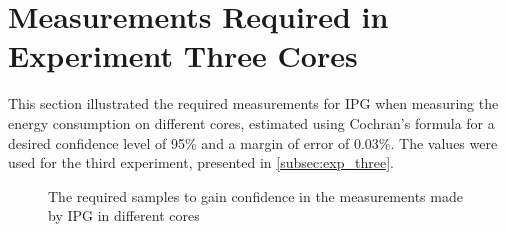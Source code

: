 \section{Measurements Required in Experiment Three Cores}\label{app:exp_three_coch}

This section illustrated the required measurements for IPG when measuring the energy consumption on different cores, estimated using Cochran's formula for a desired confidence level of 95\% and a margin of error of 0.03\%. The values were used for the third experiment, presented in \cref{subsec:exp_three}.

% 
% 

\begin{figure}[H]
    \centering
    \begin{subfigure}[b]{0.4\textwidth}
        \centering
        
    \end{subfigure}
    \hfill
    \begin{subfigure}[b]{0.4\textwidth}
        \centering
        
    \end{subfigure}
    \caption{The required samples to gain confidence in the measurements made by IPG in different cores}
\end{figure}